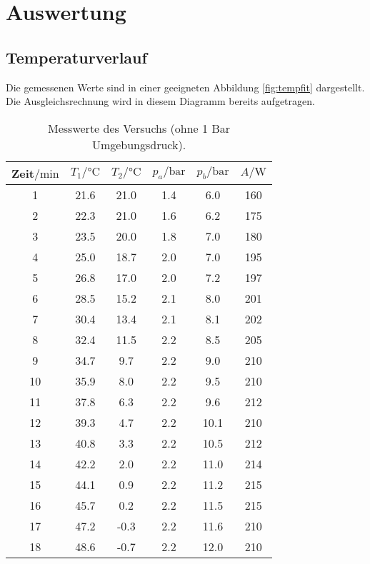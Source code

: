 \section{Auswertung}
\label{sec:Auswertung}
\subsection{Temperaturverlauf}
Die gemessenen Werte sind in einer geeigneten Abbildung \ref{fig:tempfit} dargestellt.
Die Ausgleichsrechnung wird in diesem Diagramm bereits aufgetragen.
\begin{table}[H]
    \centering
    \caption{Messwerte des Versuchs (ohne 1 Bar Umgebungsdruck).}
    \label{tab:t1}
    \begin{tabular}{S[table-format=2.0] S S S S S[table-format=3.0]}
        \toprule
        {Zeit$/\si{\minute}$} & {$T_1/\si{\celsius}$} & {$T_2/\si{\celsius}$} & {$p_a/\si{\bar}$} & {$p_b/\si{\bar}$} & {$A/\si{\watt}$}\\
           & 21.6  & 21.0  & 1.4   & 6.0   & 160   \\
        2   & 22.3  & 21.0  & 1.6   & 6.2   & 175   \\
        3   & 23.5  & 20.0  & 1.8   & 7.0   & 180   \\
        4   & 25.0  & 18.7  & 2.0   & 7.0   & 195   \\
        5   & 26.8  & 17.0  & 2.0   & 7.2   & 197   \\
        6   & 28.5  & 15.2  & 2.1   & 8.0   & 201   \\
        7   & 30.4  & 13.4  & 2.1   & 8.1   & 202   \\
        8   & 32.4  & 11.5  & 2.2   & 8.5   & 205   \\
        9   & 34.7  & 9.7   & 2.2   & 9.0   & 210   \\
        10  & 35.9  & 8.0   & 2.2   & 9.5   & 210   \\
        11  & 37.8  & 6.3   & 2.2   & 9.6   & 212   \\
        12  & 39.3  & 4.7   & 2.2   & 10.1  & 210   \\
        13  & 40.8  & 3.3   & 2.2   & 10.5  & 212   \\
        14  & 42.2  & 2.0   & 2.2   & 11.0  & 214   \\
        15  & 44.1  & 0.9   & 2.2   & 11.2  & 215   \\
        16  & 45.7  & 0.2   & 2.2   & 11.5  & 215   \\
        17  & 47.2  & -0.3  & 2.2   & 11.6  & 210   \\
        18  & 48.6  & -0.7  & 2.2   & 12.0  & 210   \\
        \bottomrule
    \end{tabular}
\end{table}
